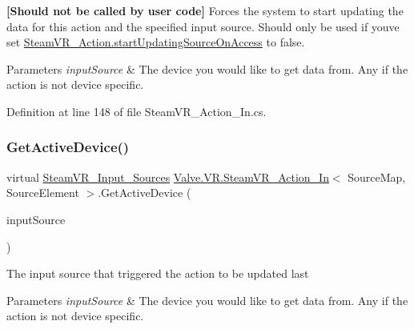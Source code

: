 {\bfseries{\mbox{[}Should not be called by user code\mbox{]}}} Forces the system to start updating the data for this action and the specified input source. Should only be used if you\textquotesingle{}ve set \mbox{\hyperlink{class_valve_1_1_v_r_1_1_steam_v_r___action_ae27e9858dec18a4307cca7779ed87ad8}{Steam\+V\+R\+\_\+\+Action.\+start\+Updating\+Source\+On\+Access}} to false. 


\begin{DoxyParams}{Parameters}
{\em input\+Source} & The device you would like to get data from. Any if the action is not device specific.\\
\hline
\end{DoxyParams}


Definition at line 148 of file Steam\+V\+R\+\_\+\+Action\+\_\+\+In.\+cs.

\mbox{\label{class_valve_1_1_v_r_1_1_steam_v_r___action___in_a2cf3c55c01761a091db3afb42a3d47f2}} 
\subsubsection{\texorpdfstring{GetActiveDevice()}{GetActiveDevice()}}
{\footnotesize\ttfamily virtual \mbox{\hyperlink{namespace_valve_1_1_v_r_a82e5bf501cc3aa155444ee3f0662853f}{Steam\+V\+R\+\_\+\+Input\+\_\+\+Sources}} \mbox{\hyperlink{class_valve_1_1_v_r_1_1_steam_v_r___action___in}{Valve.\+V\+R.\+Steam\+V\+R\+\_\+\+Action\+\_\+\+In}}$<$ Source\+Map, Source\+Element $>$.Get\+Active\+Device (\begin{DoxyParamCaption}\item[{\mbox{\hyperlink{namespace_valve_1_1_v_r_a82e5bf501cc3aa155444ee3f0662853f}{Steam\+V\+R\+\_\+\+Input\+\_\+\+Sources}}}]{input\+Source }\end{DoxyParamCaption})\hspace{0.3cm}{\ttfamily [virtual]}}



The input source that triggered the action to be updated last 


\begin{DoxyParams}{Parameters}
{\em input\+Source} & The device you would like to get data from. Any if the action is not device specific.\\
\hline
\end{DoxyParams}


